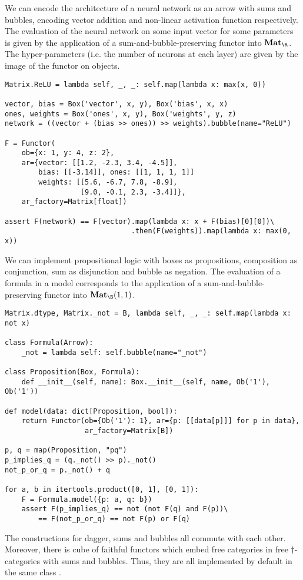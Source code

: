 \begin{example}
We can encode the architecture of a neural network as an arrow with sums and bubbles, encoding vector addition and non-linear activation function respectively.
The evaluation of the neural network on some input vector for some parameters is given by the application of a sum-and-bubble-preserving functor into $\mathbf{Mat}_\R$.
The hyper-parameters (i.e. the number of neurons at each layer) are given by the image of the functor on objects.

\begin{verbatim}
Matrix.ReLU = lambda self, _, _: self.map(lambda x: max(x, 0))

vector, bias = Box('vector', x, y), Box('bias', x, x)
ones, weights = Box('ones', x, y), Box('weights', y, z)
network = ((vector + (bias >> ones)) >> weights).bubble(name="ReLU")

F = Functor(
    ob={x: 1, y: 4, z: 2},
    ar={vector: [[1.2, -2.3, 3.4, -4.5]],
        bias: [[-3.14]], ones: [[1, 1, 1, 1]]
        weights: [[5.6, -6.7, 7.8, -8.9],
                  [9.0, -0.1, 2.3, -3.4]]},
    ar_factory=Matrix[float])

assert F(network) == F(vector).map(lambda x: x + F(bias)[0][0])\
                              .then(F(weights)).map(lambda x: max(0, x))
\end{verbatim}
\end{example}

\begin{example}
We can implement propositional logic with boxes as propositions, composition as conjunction, sum as disjunction and bubble as negation.
The evaluation of a formula in a model corresponds to the application of a sum-and-bubble-preserving functor into $\mathbf{Mat}_\B(1, 1)$.

\begin{verbatim}
Matrix.dtype, Matrix._not = B, lambda self, _, _: self.map(lambda x: not x)

class Formula(Arrow):
    _not = lambda self: self.bubble(name="_not")

class Proposition(Box, Formula):
    def __init__(self, name): Box.__init__(self, name, Ob('1'), Ob('1'))

def model(data: dict[Proposition, bool]):
    return Functor(ob={Ob('1'): 1}, ar={p: [[data[p]]] for p in data},
                   ar_factory=Matrix[B])

p, q = map(Proposition, "pq")
p_implies_q = (q._not() >> p)._not()
not_p_or_q = p._not() + q

for a, b in itertools.product([0, 1], [0, 1]):
    F = Formula.model({p: a, q: b})
    assert F(p_implies_q) == not (not F(q) and F(p))\
        == F(not_p_or_q) == not F(p) or F(q)
\end{verbatim}
\end{example}

\begin{remark}
The constructions for dagger, sums and bubbles all commute with each other.
Moreover, there is cube of faithful functors which embed free categories in free $\dagger$-categories with sums and bubbles.
Thus, they are all implemented by default in the same class \py{Arrow}.
\end{remark}
